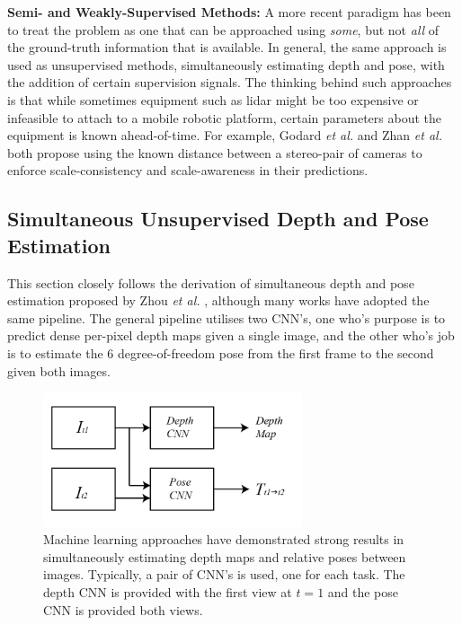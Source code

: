 \textbf{Semi- and Weakly-Supervised Methods: } A more recent paradigm has been to treat the problem as one that can be approached using \textit{some}, but not \textit{all} of the ground-truth information that is available. In general, the same approach is used as unsupervised methods, simultaneously estimating depth and pose, with the addition of certain supervision signals. The thinking behind such approaches is that while sometimes equipment such as lidar might be too expensive or infeasible to attach to a mobile robotic platform, certain parameters about the equipment is known ahead-of-time. For example, Godard \textit{et al.} \cite{godard2016consistency} and Zhan \textit{et al.} \cite{zhan2018deepfeature} both propose using the known distance between a stereo-pair of cameras to enforce scale-consistency and scale-awareness in their predictions.


\subsection{Simultaneous Unsupervised Depth and Pose Estimation}
This section closely follows the derivation of simultaneous depth and pose estimation proposed by Zhou \textit{et al.} \cite{zhou2017unsupervised}, although many works have adopted the same pipeline. The general pipeline utilises two CNN's, one who's purpose is to predict dense per-pixel depth maps given a single image, and the other who's job is to estimate the 6 degree-of-freedom pose from the first frame to the second given both images.

\begin{figure}[htbp]
    \centering
    \includegraphics[width=3in]{images/cnns.png}
    \caption{Machine learning approaches have demonstrated strong results in simultaneously estimating depth maps and relative poses between images. Typically, a pair of CNN's is used, one for each task. The depth CNN is provided with the first view at $t=1$ and the pose CNN is provided both views.}
    \label{2cnns}
\end{figure}


